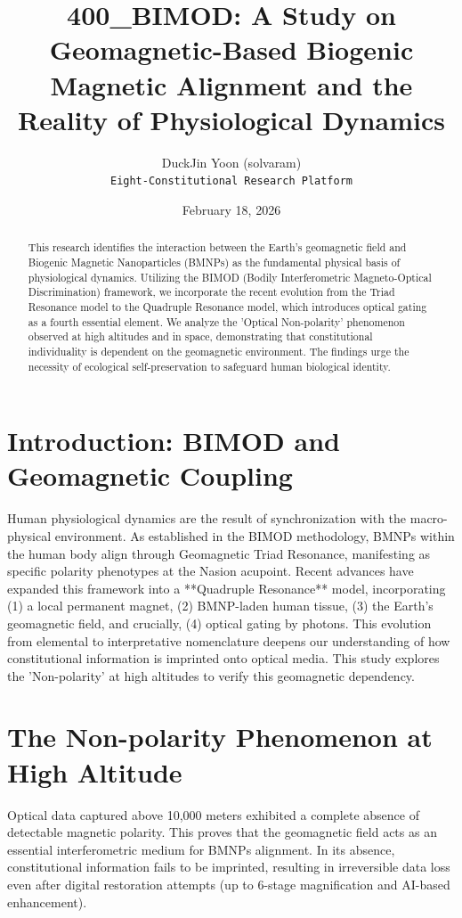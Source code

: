 \documentclass[12pt, a4paper]{article}
\title{\textbf{400\_BIMOD: A Study on Geomagnetic-Based Biogenic Magnetic Alignment and the Reality of Physiological Dynamics}}
\author{DuckJin Yoon (solvaram) \\
\texttt{Eight-Constitutional Research Platform}}
\date{February 18, 2026}
\begin{document}
\maketitle

\begin{abstract}
This research identifies the interaction between the Earth's geomagnetic field and Biogenic Magnetic Nanoparticles (BMNPs) as the fundamental physical basis of physiological dynamics. Utilizing the BIMOD (Bodily Interferometric Magneto-Optical Discrimination) framework, we incorporate the recent evolution from the Triad Resonance model\cite{Yoon_BIMOD_001_v2} to the Quadruple Resonance model\cite{Yoon_BIMOD_001_v3}, which introduces optical gating as a fourth essential element. We analyze the 'Optical Non-polarity' phenomenon observed at high altitudes and in space, demonstrating that constitutional individuality is dependent on the geomagnetic environment. The findings urge the necessity of ecological self-preservation to safeguard human biological identity.
\end{abstract}

\section{Introduction: BIMOD and Geomagnetic Coupling}
Human physiological dynamics are the result of synchronization with the macro-physical environment. As established in the BIMOD methodology\cite{Yoon_BIMOD_001_v2}, BMNPs within the human body align through Geomagnetic Triad Resonance, manifesting as specific polarity phenotypes at the Nasion acupoint\cite{Yoon_Nasion_003}. Recent advances have expanded this framework into a **Quadruple Resonance** model\cite{Yoon_BIMOD_001_v3}, incorporating (1) a local permanent magnet, (2) BMNP-laden human tissue, (3) the Earth's geomagnetic field, and crucially, (4) optical gating by photons. This evolution from elemental to interpretative nomenclature deepens our understanding of how constitutional information is imprinted onto optical media. This study explores the 'Non-polarity' at high altitudes to verify this geomagnetic dependency.

\section{The Non-polarity Phenomenon at High Altitude}
Optical data captured above 10,000 meters exhibited a complete absence of detectable magnetic polarity. This proves that the geomagnetic field acts as an essential interferometric medium for BMNPs alignment. In its absence, constitutional information fails to be imprinted, resulting in irreversible data loss even after digital restoration attempts (up to 6-stage magnification and AI-based enhancement)\cite{Wang2019, Dubrov2013}.
\end{document}
